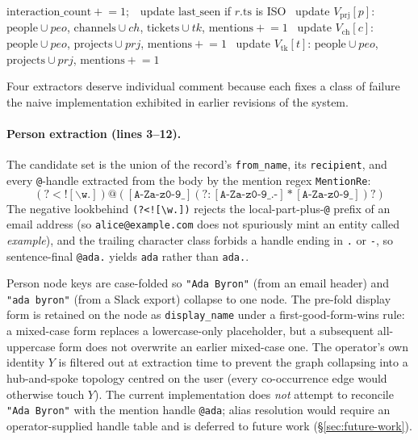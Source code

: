 \begin{algorithm}[t]
\begin{algorithmic}[1]
  \Statex\hspace{2em}$\mathrm{interaction\_count} \mathrel{+}= 1$;\ \ update $\mathrm{last\_seen}$ if $r.\mathrm{ts}$ is ISO
\EndFor
{}\ update $V_{\mathrm{prj}}[p]$: $\mathrm{people} \cup \mathit{peo}$, $\mathrm{channels} \cup \mathit{ch}$, $\mathrm{tickets} \cup \mathit{tk}$, $\mathrm{mentions}\mathrel{+}=1$ \EndFor
{}\ update $V_{\mathrm{ch}}[c]$: $\mathrm{people} \cup \mathit{peo}$, $\mathrm{projects} \cup \mathit{prj}$, $\mathrm{mentions}\mathrel{+}=1$ \EndFor
{}\ update $V_{\mathrm{tk}}[t]$: $\mathrm{people} \cup \mathit{peo}$, $\mathrm{projects} \cup \mathit{prj}$, $\mathrm{mentions}\mathrel{+}=1$ \EndFor
\end{algorithmic}
\end{algorithm}

Four extractors deserve individual comment because each fixes a class of failure the naive implementation exhibited in earlier revisions of the system.

\paragraph{Person extraction (lines 3--12).}
The candidate set is the union of the record's \texttt{from\_name}, its \texttt{recipient}, and every \texttt{@}-handle extracted from the body by the mention regex \texttt{MentionRe}:
\[
\mathtt{(?<![\backslash w.])@([A\text{-}Za\text{-}z0\text{-}9\_](?:[A\text{-}Za\text{-}z0\text{-}9\_.\text{-}]*[A\text{-}Za\text{-}z0\text{-}9\_])?)}
\]
The negative lookbehind \texttt{(?<![\textbackslash w.])} rejects the local-part-plus-\texttt{@} prefix of an email address (so \texttt{alice@example.com} does not spuriously mint an entity called \emph{example}), and the trailing character class forbids a handle ending in \texttt{.} or \texttt{-}, so sentence-final \texttt{@ada.} yields \texttt{ada} rather than \texttt{ada.}.

Person node keys are case-folded so \texttt{"Ada Byron"} (from an email header) and \texttt{"ada byron"} (from a Slack export) collapse to one node. The pre-fold display form is retained on the node as \texttt{display\_name} under a first-good-form-wins rule: a mixed-case form replaces a lowercase-only placeholder, but a subsequent all-uppercase form does not overwrite an earlier mixed-case one. The operator's own identity $Y$ is filtered out at extraction time to prevent the graph collapsing into a hub-and-spoke topology centred on the user (every co-occurrence edge would otherwise touch $Y$). The current implementation does \emph{not} attempt to reconcile \texttt{"Ada Byron"} with the mention handle \texttt{@ada}; alias resolution would require an operator-supplied handle table and is deferred to future work (\S\ref{sec:future-work}).

